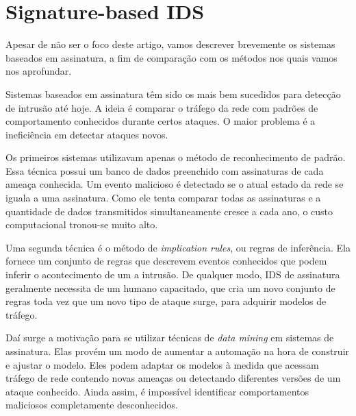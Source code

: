 \chapter{Signature-based IDS}
\label{chap:snids}
Apesar de não ser o foco deste artigo, vamos descrever brevemente os sistemas baseados em assinatura, a fim de
comparação com os métodos nos quais vamos nos aprofundar.
\par Sistemas baseados em assinatura têm sido os mais bem sucedidos para detecção de intrusão até hoje.
A ideia é comparar o tráfego da rede com padrões de comportamento conhecidos durante certos ataques.
O maior problema é a ineficiência em detectar ataques novos.
\par Os primeiros sistemas utilizavam apenas o método de reconhecimento de padrão. Essa técnica possui um banco de dados
 preenchido com assinaturas de cada ameaça conhecida. Um evento malicioso é detectado se o atual estado da rede se iguala
 a uma assinatura. Como ele tenta comparar todas as assinaturas e a quantidade de dados transmitidos simultaneamente
cresce a cada ano, o custo computacional tronou-se muito alto.
\par Uma segunda técnica é o método de \textit{implication rules}, ou regras de inferência. Ela fornece um conjunto de
regras que descrevem eventos conhecidos que podem inferir o acontecimento de um a intrusão. De qualquer modo, IDS de
assinatura geralmente necessita de um humano capacitado, que cria um novo conjunto de regras toda vez que um novo
tipo de ataque surge, para adquirir modelos de tráfego.
\par Daí surge a motivação para se utilizar técnicas de \textit{data mining} em sistemas de assinatura. Elas provém um
 modo de aumentar a automação na hora de construir e ajustar o modelo. Eles podem adaptar os modelos à medida que
 acessam tráfego de rede contendo novas ameaças ou detectando diferentes versões de um ataque conhecido. Ainda assim,
 é impossível identificar comportamentos maliciosos completamente desconhecidos.